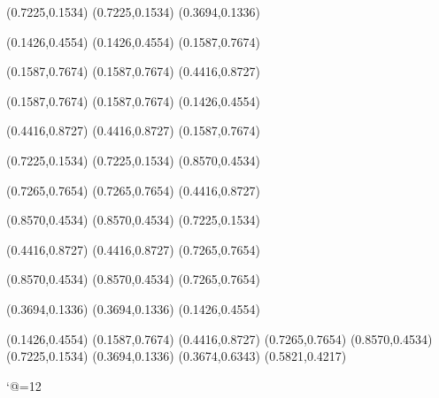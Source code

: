 \PST@Border(0.7225,0.1534)
(0.7225,0.1534)
(0.3694,0.1336)

\PST@Border(0.1426,0.4554)
(0.1426,0.4554)
(0.1587,0.7674)

\PST@Border(0.1587,0.7674)
(0.1587,0.7674)
(0.4416,0.8727)




\PST@Border(0.1587,0.7674)
(0.1587,0.7674)
(0.1426,0.4554)








\PST@Border(0.4416,0.8727)
(0.4416,0.8727)
(0.1587,0.7674)

\PST@Border(0.7225,0.1534)
(0.7225,0.1534)
(0.8570,0.4534)

\PST@Border(0.7265,0.7654)
(0.7265,0.7654)
(0.4416,0.8727)





\PST@Border(0.8570,0.4534)
(0.8570,0.4534)
(0.7225,0.1534)


\PST@Border(0.4416,0.8727)
(0.4416,0.8727)
(0.7265,0.7654)

\PST@Border(0.8570,0.4534)
(0.8570,0.4534)
(0.7265,0.7654)


\PST@Border(0.3694,0.1336)
(0.3694,0.1336)
(0.1426,0.4554)


\PST@Fillcircle(0.1426,0.4554)
\PST@Fillcircle(0.1587,0.7674)
\PST@Fillcircle(0.4416,0.8727)
\PST@Fillcircle(0.7265,0.7654)
\PST@Fillcircle(0.8570,0.4534)
\PST@Fillcircle(0.7225,0.1534)
\PST@Fillcircle(0.3694,0.1336)
\PST@Fillcircle(0.3674,0.6343)
\PST@Fillcircle(0.5821,0.4217)

\catcode`@=12
\fi
\endpspicture
